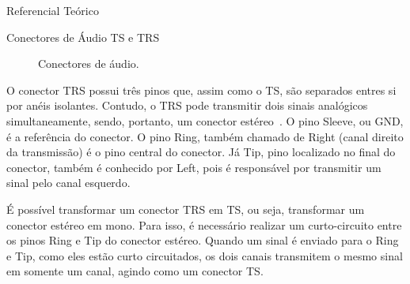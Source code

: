 \begin{chapter}{Referencial Teórico}
\begin{section}{Conectores de Áudio TS e TRS}

\begin{figure}
	\centering
	\caption{Conectores de áudio.}
	\label{fig:conector}
\end{figure}

O conector TRS possui três pinos que, assim como o TS, são separados 
entres si por anéis isolantes. Contudo, o TRS pode transmitir dois sinais
analógicos simultaneamente, sendo, portanto, um conector estéreo~\cite{ts}. O
pino Sleeve, ou GND, é a referência do conector. O pino Ring, também chamado de
Right (canal direito da transmissão) é o  pino central do conector. Já Tip,
pino localizado no final do conector, também é conhecido por Left, pois é 
responsável por transmitir um sinal pelo canal esquerdo.

\break 
É possível transformar um conector TRS em TS, ou seja, transformar um conector
estéreo em mono. Para isso, é necessário realizar um curto-circuito entre os
pinos Ring e Tip do conector estéreo. Quando um sinal é enviado para o Ring e
Tip, como eles estão curto circuitados, os dois canais transmitem o mesmo
sinal em somente um canal, agindo como um conector TS.



\end{section}
\end{chapter}
